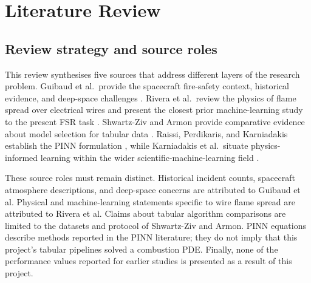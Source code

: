 \chapter{Literature Review}
\label{chap:literature_review}

\section{Review strategy and source roles}

This review synthesises five sources that address different layers of the research problem. Guibaud et al.\ provide the spacecraft fire-safety context, historical evidence, and deep-space challenges \cite{guibaud2022spacecraft}. Rivera et al.\ review the physics of flame spread over electrical wires and present the closest prior machine-learning study to the present FSR task \cite{riveraWireML}. Shwartz-Ziv and Armon provide comparative evidence about model selection for tabular data \cite{shwartzZiv2022tabular}. Raissi, Perdikaris, and Karniadakis establish the PINN formulation \cite{raissi2019pinn}, while Karniadakis et al.\ situate physics-informed learning within the wider scientific-machine-learning field \cite{karniadakis2021physicsinformed}.

These source roles must remain distinct. Historical incident counts, spacecraft atmosphere descriptions, and deep-space concerns are attributed to Guibaud et al. Physical and machine-learning statements specific to wire flame spread are attributed to Rivera et al. Claims about tabular algorithm comparisons are limited to the datasets and protocol of Shwartz-Ziv and Armon. PINN equations describe methods reported in the PINN literature; they do not imply that this project's tabular pipelines solved a combustion PDE. Finally, none of the performance values reported for earlier studies is presented as a result of this project.

